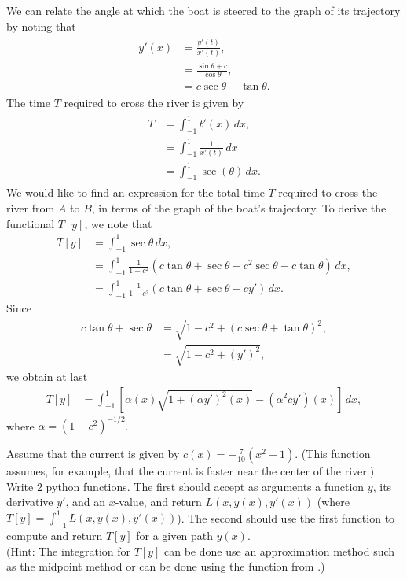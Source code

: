 We can relate the angle at which the boat is steered to the graph of its trajectory by noting that 
\begin{align}
\begin{split}
	y'(x) &= \frac{y'(t)}{x'(t)} ,\\
	&= \frac{\sin \theta + c}{\cos \theta},\\
	&= c\sec \theta + \tan \theta .%
\end{split} \label{rivercrossing:angle}
\end{align}
The time $T$ required to cross the river is given by
\begin{align}
\begin{split}
	T &= \int_{-1}^1 t'(x)\, dx, \\
	&= \int_{-1}^1 \frac{1}{x'(t)}\, dx \\ 
	&= \int_{-1}^1 \sec (\theta)\, dx. 
\end{split}\label{rivercrossing:T}
\end{align}
We would like to find an expression for the total time $T$ required to cross the river from $A$ to $B$, in terms of the graph of the boat's trajectory. 
To derive the functional $T[y]$, we note that 
\begin{align*}
	T[y] &= \int_{-1}^1 \sec \theta\, dx,\\
	&= \int_{-1}^1 \frac{1}{1-c^2}(c \tan \theta + \sec \theta -c^2 \sec \theta - c\tan \theta)\, dx, \\
	&= \int_{-1}^1 \frac{1}{1-c^2}(c \tan \theta + \sec \theta -c y' )\, dx.	
\end{align*}
Since 
\begin{align*}
	c\tan \theta + \sec \theta &= \sqrt{1 - c^2 + (c \sec \theta + \tan \theta)^2},\\
	&= \sqrt{1 - c^2 + (y')^2},
\end{align*}
we obtain at last
\begin{align}
	T[y] &= \int_{-1}^1 \left[ \alpha(x)\sqrt{1 + (\alpha y')^2(x)} - (\alpha^2 c y')(x) \right]\, dx,
\end{align}
where $\alpha = (1 - c^2)^{-1/2}$.

\begin{problem}
Assume that the current is given by $c(x) = -\frac{7}{10}(x^2-1)$. (This function assumes, for example, that the current is faster near the center of the river.)
Write 2 python functions. The first should accept as arguments a function $y$, its derivative $y'$, and an $x$-value, and return $L(x,y(x),y'(x))$ (where $T[y] = \int_{-1}^1 L(x,y(x),y'(x))$). 
The second should use the first function to compute and return $T[y]$ for a given path $y(x)$.
\\ (Hint: The integration for $T[y]$ can be done use an approximation method such as the midpoint method or can be done using the  function from .)
\end{problem}

